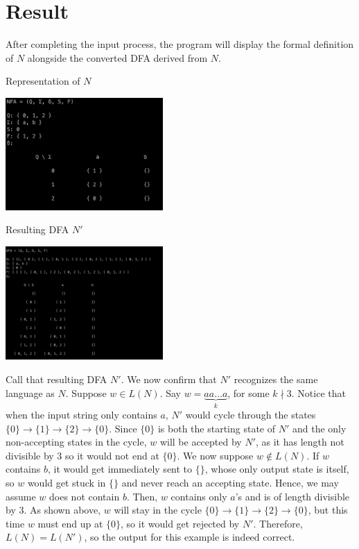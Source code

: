 \documentclass{article}
\begin{document}
\newpage

\section*{Result}

After completing the input process, the program will display the formal definition of $N$ alongside
the converted DFA derived from $N$.

\begin{center}
  \begin{multicols}{2}
    Representation of $N$

    \includegraphics[width=0.45\textwidth]{NFA}

    \columnbreak 

    Resulting DFA $N'$

    \includegraphics[width=0.45\textwidth]{DFA}
  \end{multicols}
\end{center}

Call that resulting DFA $N'$. We now confirm that $N'$ recognizes the same language as $N$. Suppose
$w \in L(N)$. Say $w = \underbrace{aa \dots a}_{k}$, for some $k \nmid 3$. Notice that when the
input string only contains $a$, $N'$ would cycle through the states $\{0\} \rightarrow \{1\}
\rightarrow \{2\} \rightarrow \{0\}$. Since $\{0\}$ is both the starting state of $N'$ and the only
non-accepting states in the cycle, $w$ will be accepted by $N'$, as it has length not divisible by 3
so it would not end at $\{0\}$. We now suppose $w \notin L(N)$. If $w$ contains $b$, it would get
immediately sent to $\{\}$, whose only output state is itself, so $w$ would get stuck in $\{\}$ and
never reach an accepting state. Hence, we may assume $w$ does not contain $b$. Then, $w$ contains
only $a$'s and is of length divisible by $3$. As shown above, $w$ will stay in the cycle $\{0\}
\rightarrow \{1\} \rightarrow \{2\} \rightarrow \{0\}$, but this time $w$ must end up at $\{0\}$, so
it would get rejected by $N'$. Therefore, $L(N) = L(N')$, so the output for this example is indeed
correct.
\end{document}
